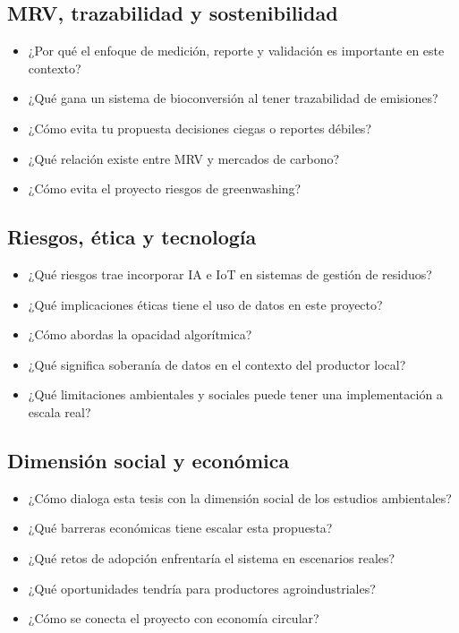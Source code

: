 \documentclass[11pt]{article}
\begin{document}
\subsection*{MRV, trazabilidad y sostenibilidad}
\begin{itemize}[leftmargin=*]
    \item ¿Por qué el enfoque de medición, reporte y validación es importante en este contexto?
    \item ¿Qué gana un sistema de bioconversión al tener trazabilidad de emisiones?
    \item ¿Cómo evita tu propuesta decisiones ciegas o reportes débiles?
    \item ¿Qué relación existe entre MRV y mercados de carbono?
    \item ¿Cómo evita el proyecto riesgos de greenwashing?
\end{itemize}

\subsection*{Riesgos, ética y tecnología}
\begin{itemize}[leftmargin=*]
    \item ¿Qué riesgos trae incorporar IA e IoT en sistemas de gestión de residuos?
    \item ¿Qué implicaciones éticas tiene el uso de datos en este proyecto?
    \item ¿Cómo abordas la opacidad algorítmica?
    \item ¿Qué significa soberanía de datos en el contexto del productor local?
    \item ¿Qué limitaciones ambientales y sociales puede tener una implementación a escala real?
\end{itemize}

\subsection*{Dimensión social y económica}
\begin{itemize}[leftmargin=*]
    \item ¿Cómo dialoga esta tesis con la dimensión social de los estudios ambientales?
    \item ¿Qué barreras económicas tiene escalar esta propuesta?
    \item ¿Qué retos de adopción enfrentaría el sistema en escenarios reales?
    \item ¿Qué oportunidades tendría para productores agroindustriales?
    \item ¿Cómo se conecta el proyecto con economía circular?
\end{itemize}
\end{document}
